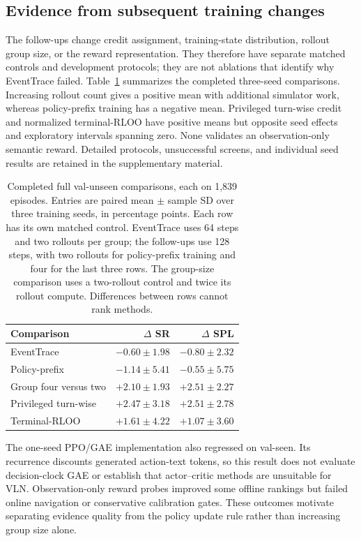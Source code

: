 \documentclass[10pt,twocolumn,letterpaper]{article}
\begin{document}
\subsection{Evidence from subsequent training changes}
The follow-ups change credit assignment, training-state distribution,
rollout group size, or the reward representation. They therefore have
separate matched controls and development protocols; they are not
ablations that identify why EventTrace failed. Table~\ref{tab:followup-summary}
summarizes the completed three-seed comparisons. Increasing rollout
count gives a positive mean with additional simulator work, whereas
policy-prefix training has a negative mean. Privileged turn-wise credit
and normalized terminal-RLOO have positive means but opposite seed effects
and exploratory intervals spanning zero. None validates an observation-only
semantic reward. Detailed protocols, unsuccessful screens, and individual
seed results are retained in the supplementary material.

\begin{table}[t]
\centering
\caption{Completed full val-unseen comparisons, each on 1,839 episodes.
Entries are paired mean $\pm$ sample SD over three training seeds, in
percentage points. Each row has its own matched control. EventTrace uses
64 steps and two rollouts per group; the follow-ups use 128 steps, with
two rollouts for policy-prefix training and four for the last three rows.
The group-size comparison uses a two-rollout control and twice its rollout
compute. Differences between rows cannot rank methods.}
\label{tab:followup-summary}
\footnotesize
\begingroup\setlength{\tabcolsep}{3pt}
\begin{tabular}{@{}lrr@{}}
\toprule
Comparison & $\Delta$ SR & $\Delta$ SPL \\
\midrule
EventTrace & $-0.60\pm1.98$ & $-0.80\pm2.32$ \\
Policy-prefix & $-1.14\pm5.41$ & $-0.55\pm5.75$ \\
Group four versus two & $+2.10\pm1.93$ & $+2.51\pm2.27$ \\
Privileged turn-wise & $+2.47\pm3.18$ & $+2.51\pm2.78$ \\
Terminal-RLOO & $+1.61\pm4.22$ & $+1.07\pm3.60$ \\
\bottomrule
\end{tabular}
\endgroup
\end{table}

The one-seed PPO/GAE implementation also regressed on val-seen. Its
recurrence discounts generated action-text tokens, so this result does
not evaluate decision-clock GAE or establish that actor--critic methods
are unsuitable for VLN. Observation-only reward probes improved some
offline rankings but failed online navigation or conservative calibration
gates. These outcomes motivate separating evidence quality from the
policy update rule rather than increasing group size alone.
\end{document}

